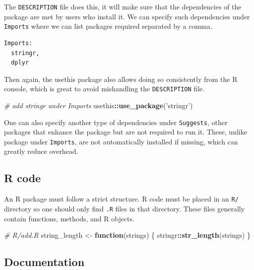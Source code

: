 \documentclass[10pt,]{krantz}
\makeatletter
\newenvironment{Shaded}{\begin{snugshade}}{\end{snugshade}}
\newcommand{\CommentTok}[1]{\textcolor[rgb]{0.37,0.37,0.37}{\textit{#1}}}
\newcommand{\ControlFlowTok}[1]{\textcolor[rgb]{0.27,0.27,0.27}{\textbf{#1}}}
\newcommand{\KeywordTok}[1]{\textcolor[rgb]{0.27,0.27,0.27}{\textbf{#1}}}
\newcommand{\NormalTok}[1]{#1}
\newcommand{\OperatorTok}[1]{\textcolor[rgb]{0.43,0.43,0.43}{\textbf{#1}}}
\newcommand{\StringTok}[1]{\textcolor[rgb]{0.5,0.5,0.5}{#1}}
\newenvironment{kframe}{%
\medskip{}
\setlength{\fboxsep}{.8em}
 \def\at@end@of@kframe{}%
 \ifinner\ifhmode%
  \def\at@end@of@kframe{\end{minipage}}%
  \begin{minipage}{\columnwidth}%
 \fi\fi%
 \def\FrameCommand##1{\hskip\@totalleftmargin \hskip-\fboxsep
 \colorbox{shadecolor}{##1}\hskip-\fboxsep
     \hskip-\linewidth \hskip-\@totalleftmargin \hskip\columnwidth}%
 \MakeFramed {\advance\hsize-\width
   \@totalleftmargin\z@ \linewidth\hsize
   \@setminipage}}%
 {\par\unskip\endMakeFramed%
 \at@end@of@kframe}
\renewenvironment{Shaded}{\begin{kframe}}{\end{kframe}}
\makeatother
\begin{document}
The \texttt{DESCRIPTION} file does this, it will make sure that the dependencies of the package are met by users who install it. We can specify such dependencies under \texttt{Imports} where we can list packages required separated by a comma.

\begin{verbatim}
Imports:
  stringr,
  dplyr
\end{verbatim}

Then again, the usethis package also allows doing so consistently from the R console, which is great to avoid mishandling the \texttt{DESCRIPTION} file.

\begin{Shaded}
\begin{Highlighting}[]
\CommentTok{# add stringr under Imports}
\NormalTok{usethis}\OperatorTok{::}\KeywordTok{use_package}\NormalTok{(}\StringTok{'stringr'}\NormalTok{)}
\end{Highlighting}
\end{Shaded}

One can also specify another type of dependencies under \texttt{Suggests}, other packages that enhance the package but are not required to run it. These, unlike package under \texttt{Imports}, are not automatically installed if missing, which can greatly reduce overhead.

\hypertarget{basics-r-code}{%
\subsection{R code}\label{basics-r-code}}

An R package must follow a strict structure. R code must be placed in an \texttt{R/} directory so one should only find \texttt{.R} files in that directory. These files generally contain functions, methods, and R objects.

\begin{Shaded}
\begin{Highlighting}[]
\CommentTok{# R/add.R}
\NormalTok{string_length <-}\StringTok{ }\ControlFlowTok{function}\NormalTok{(strings) \{}
\NormalTok{  stringr}\OperatorTok{::}\KeywordTok{str_length}\NormalTok{(strings)}
\NormalTok{\}}
\end{Highlighting}
\end{Shaded}

\hypertarget{basics-documentation}{%
\subsection{Documentation}\label{basics-documentation}}
\end{document}
